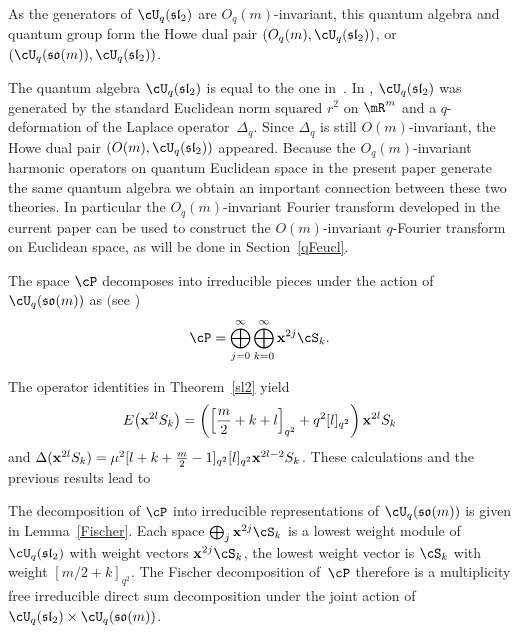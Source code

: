 \begin{remark}
As the generators of $\cU_q(\mathfrak{sl}_2)$ are $O_q(m)$-invariant, this quantum algebra and quantum group form the Howe dual pair $(O_q(m),\cU_q(\mathfrak{sl}_2))$, or $(\cU_q(\mathfrak{so}(m)),\cU_q(\mathfrak{sl}_2))$.
\end{remark}

The quantum algebra $\cU_q(\mathfrak{sl}_2)$ is equal to the one in~\cite{MR2595267}. In \cite{MR2595267}, $\cU_q(\mathfrak{sl}_2)$ was generated by the standard Euclidean norm squared $r^2$ on $\mR^m$ and a $q$-deformation of the Laplace operator~$\Delta_q$. Since $\Delta_q$ is still $O(m)$-invariant, the Howe dual pair $(O(m),\cU_q(\mathfrak{sl}_2))$ appeared. Because the $O_q(m)$-invariant harmonic operators on quantum Euclidean space in the present paper generate the same quantum algebra we obtain an important connection between these two theories. In particular the $O_q(m)$-invariant Fourier transform developed in the current paper can be used to construct the $O(m)$-invariant $q$-Fourier transform on Euclidean space, as will be done in Section~\ref{qFeucl}.

\begin{lemma}
\label{Fischer}
The space $\cP$ decomposes into irreducible pieces under the action of $\cU_q(\mathfrak{so}(m))$ as $($see {\rm \cite{MR2006509, MR1328733})}
\begin{gather*}
\cP=\bigoplus_{j=0}^{\infty}\bigoplus_{k=0}^\infty\bold{x}^{2j}\cS_{k}.
\end{gather*}
\end{lemma}


The operator identities in Theorem~\ref{sl2} yield
\begin{gather*}
E\big(\bold{x}^{2l}S_k\big)=\left(\left[\frac{m}{2}+k+l\right]_{q^2}+q^2[l]_{q^2}\right)\bold{x}^{2l}S_k
\end{gather*}
and $\Delta(\bold{x}^{2l}S_k)=\mu^2[l+k+\frac{m}{2}-1]_{q^2}[l]_{q^2}\bold{x}^{2l-2}S_k$. These calculations and the previous results lead to
\begin{theorem}\sloppy
The decomposition of $\cP$ into irreducible representations of $\cU_q(\mathfrak{so}(m))$ is given in Lemma~{\rm \ref{Fischer}}. Each space $\bigoplus_j \bold{x}^{2j}\cS_k$ is a lowest weight module of $\cU_q(\mathfrak{sl}_2)$ with weight vectors $\bold{x}^{2j}\cS_k$, the lowest weight vector is $\cS_k$ with weight $[m/2+k]_{q^2}$. The Fischer decomposition of~$\cP$ therefore is a multiplicity free irreducible direct sum decomposition under the joint action of $\cU_q(\mathfrak{sl}_2)\times\cU_q(\mathfrak{so}(m))$.
\end{theorem}

